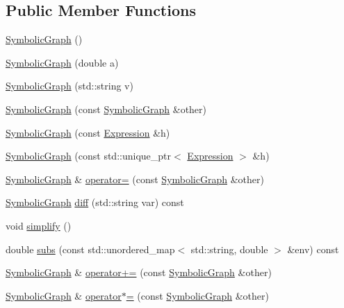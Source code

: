 \subsection*{Public Member Functions}
\begin{DoxyCompactItemize}
\item 
\hyperlink{classsymcpp_1_1SymbolicGraph_a204812fa110d379566114bf1735014d6}{Symbolic\+Graph} ()
\item 
\hyperlink{classsymcpp_1_1SymbolicGraph_aefdb7d74dcdb35fb6f7830d818e49fa9}{Symbolic\+Graph} (double a)
\item 
\hyperlink{classsymcpp_1_1SymbolicGraph_a8fd6217f7ce8d29a6aa81d60f8b2b026}{Symbolic\+Graph} (std\+::string v)
\item 
\hyperlink{classsymcpp_1_1SymbolicGraph_a4f04dca2574225bd433548d898346b50}{Symbolic\+Graph} (const \hyperlink{classsymcpp_1_1SymbolicGraph}{Symbolic\+Graph} \&other)
\item 
\hyperlink{classsymcpp_1_1SymbolicGraph_ab2f4fbb7e3cec74693e45ca6b1d27f68}{Symbolic\+Graph} (const \hyperlink{classsymcpp_1_1Expression}{Expression} \&h)
\item 
\hyperlink{classsymcpp_1_1SymbolicGraph_a42eb5be99f0c64564397be67764df5f7}{Symbolic\+Graph} (const std\+::unique\+\_\+ptr$<$ \hyperlink{classsymcpp_1_1Expression}{Expression} $>$ \&h)
\item 
\hyperlink{classsymcpp_1_1SymbolicGraph}{Symbolic\+Graph} \& \hyperlink{classsymcpp_1_1SymbolicGraph_a3998d4b2e6276d0c9df756fe559c1bb8}{operator=} (const \hyperlink{classsymcpp_1_1SymbolicGraph}{Symbolic\+Graph} \&other)
\item 
\hyperlink{classsymcpp_1_1SymbolicGraph}{Symbolic\+Graph} \hyperlink{classsymcpp_1_1SymbolicGraph_a7d7ee5ab35426cf96588edd8ece936a7}{diff} (std\+::string var) const 
\item 
void \hyperlink{classsymcpp_1_1SymbolicGraph_a1dd59d66d6015e65a8c3188d452543e3}{simplify} ()
\item 
double \hyperlink{classsymcpp_1_1SymbolicGraph_a7e261ee37155789c76c23d08a3d28399}{subs} (const std\+::unordered\+\_\+map$<$ std\+::string, double $>$ \&env) const 
\item 
\hyperlink{classsymcpp_1_1SymbolicGraph}{Symbolic\+Graph} \& \hyperlink{classsymcpp_1_1SymbolicGraph_a9db383e72ce51ecfb967fff84d5a3723}{operator+=} (const \hyperlink{classsymcpp_1_1SymbolicGraph}{Symbolic\+Graph} \&other)
\item 
\hyperlink{classsymcpp_1_1SymbolicGraph}{Symbolic\+Graph} \& \hyperlink{classsymcpp_1_1SymbolicGraph_ad3ba7327225f323e98a0db4a78434d18}{operator$\ast$=} (const \hyperlink{classsymcpp_1_1SymbolicGraph}{Symbolic\+Graph} \&other)

\end{DoxyCompactItemize}
